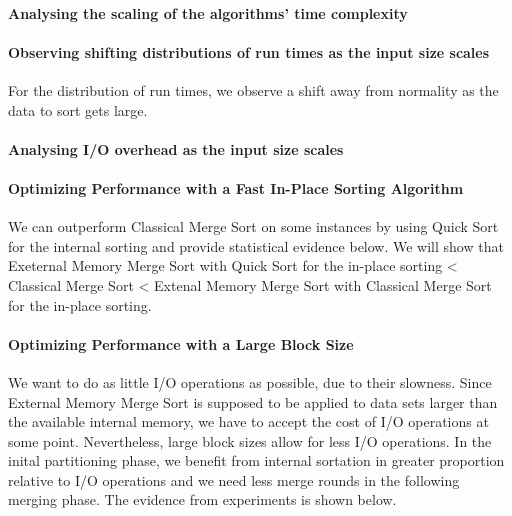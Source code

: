 \documentclass[twocolumn]{article}
\begin{document}
\paragraph*{Analysing the scaling of the algorithms' time complexity}

\paragraph*{Observing shifting distributions of run times as the input size scales}
For the distribution of run times, we observe a shift away from normality as the data to sort gets large. 

\paragraph*{Analysing I/O overhead as the input size scales}

\paragraph*{Optimizing Performance with a Fast In-Place Sorting Algorithm}
We can outperform Classical Merge Sort on some instances by using Quick Sort for the internal sorting and provide statistical evidence below.
We will show that Exeternal Memory Merge Sort with Quick Sort for the in-place sorting < Classical Merge Sort < Extenal Memory Merge Sort with Classical Merge Sort for the in-place sorting. 

\paragraph*{Optimizing Performance with a Large Block Size}
We want to do as little I/O operations as possible, due to their slowness. Since External Memory Merge Sort is supposed to be applied to data sets larger than the available internal memory, 
we have to accept the cost of I/O operations at some point. Nevertheless, large block sizes allow for less I/O operations. In the inital partitioning phase, we benefit from internal sortation 
in greater proportion relative to I/O operations and we need less merge rounds in the following merging phase. 
The evidence from experiments is shown below. 
\end{document}
